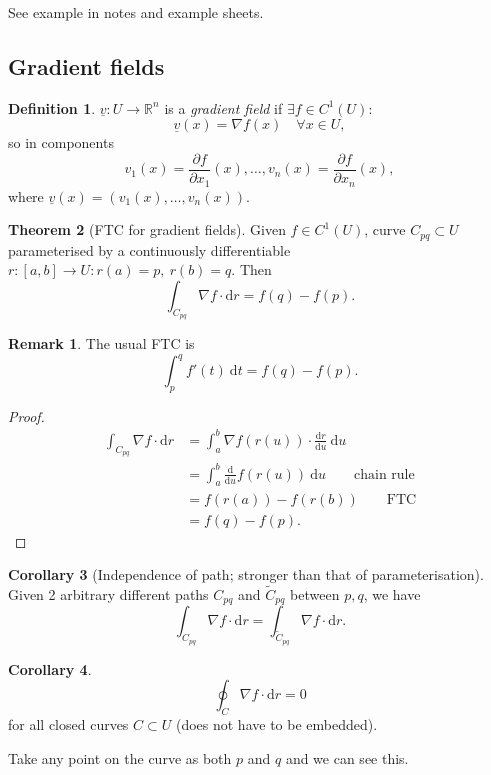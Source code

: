 \documentclass[a4paper]{article}
\theoremstyle{definition}
\newtheorem{defn}{Definition}[subsection]
\newtheorem{thm}[defn]{Theorem}
\newtheorem{coro}[defn]{Corollary}
\newtheorem*{remark}{Remark}
\begin{document}
See example in notes and example sheets.

\subsection{Gradient fields}
\begin{defn}
$\underline v : U \rightarrow \mathbb R^n$ is a \textit{gradient field} if $\exists f \in C^1 (U) :$
\[
\underline v (x) = \nabla f (x) \quad \forall x\in U,
\]
so in components
\[
v_1(x) = \frac{\partial f}{\partial x_1}(x),\ldots,v_n(x) = \frac{\partial f}{\partial x_n}(x),
\]
where $\underline v (x) = \left(v_1 (x),\ldots,v_n(x) \right)$.
\end{defn}
\begin{thm}[FTC for gradient fields]
Given $f\in C^1(U)$, curve $C_{pq}\subset U$ parameterised by a continuously differentiable $r:[a,b]\rightarrow U : r(a)=p,\ r(b)=q$. Then
\[
\int_{C_{pq}} \nabla f \cdot \mathrm d r = f(q)-f(p) .
\]
\end{thm}
\begin{remark}
The usual FTC is
\[
\int_p^q f'(t) \ \mathrm d t = f(q)-f(p).
\]
\end{remark}
\begin{proof}
\[
\begin{aligned}
\int_{C_{pq}} \nabla f \cdot \mathrm d r &= \int_a^b \nabla f (r(u)) \cdot \frac{\mathrm d r}{\mathrm d u} \ \mathrm d u \\ &= \int_a^b \frac{\mathrm d }{\mathrm d u} f(r(u)) \ \mathrm d u \qquad \text{chain rule} \\&= f(r(a))-f(r(b)) \qquad \text{FTC} \\&= f(q)-f(p).
\end{aligned}
\]
\end{proof}
\begin{coro}[Independence of path; stronger than that of parameterisation]
Given 2 arbitrary different paths $C_{pq}$ and $\tilde{C}_{pq}$ between $p,q$, we have
\[
\int_{C_{pq}} \nabla f \cdot \mathrm d r=\int_{\tilde{C}_{pq}} \nabla f \cdot \mathrm d r .
\]
\end{coro}
\begin{coro}
\[
\oint_C \nabla f \cdot \mathrm d r = 0
\]
for all closed curves $C\subset U$ (does not have to be embedded).
\end{coro}
Take any point on the curve as both $p$ and $q$ and we can see this.
\end{document}
